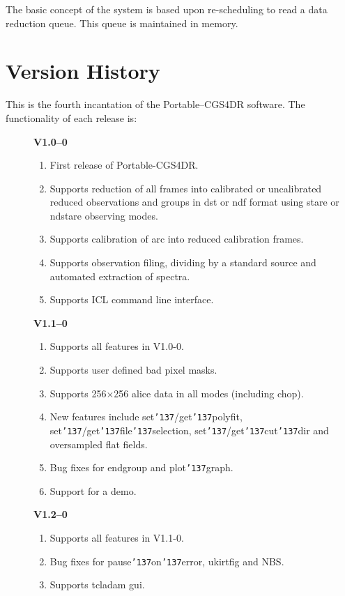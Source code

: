 \documentclass[a4paper]{book}
\renewcommand{\_}{{\tt\char'137}}
\begin{document}
The basic concept of the system is based upon re-scheduling to read a 
data reduction queue.  This queue is maintained in memory.

\section{Version History}
This is the fourth incantation of the Portable--CGS4DR software. The
functionality of each release is:

\begin{description}
\item[] {\bf V1.0--0}
 \begin{enumerate}
  \item First release of Portable-CGS4DR.
  \item Supports reduction of all frames into calibrated or uncalibrated reduced 
        observations and groups in {\sc dst} or {\sc ndf} format using {\sc stare} 
        or {\sc ndstare} observing modes.
  \item Supports calibration of {\sc arc} into reduced calibration frames.
  \item Supports observation filing, dividing by a standard source and automated
        extraction of spectra.
  \item Supports ICL command line interface.
 \end{enumerate}
\item[] {\bf V1.1--0}
 \begin{enumerate}
  \item Supports all features in V1.0-0.
  \item Supports user defined bad pixel masks.
  \item Supports 256$\times$256 {\sc alice} data in all modes (including {\sc chop}).
  \item New features include set\_/get\_polyfit, set\_/get\_file\_selection, set\_/get\_cut\_dir
        and oversampled {\sc flat} fields.
  \item Bug fixes for endgroup and plot\_graph.
  \item Support for a demo.
 \end{enumerate}
\item[] {\bf V1.2--0}
 \begin{enumerate}
  \item Supports all features in V1.1-0.
  \item Bug fixes for pause\_on\_error, ukirtfig and NBS.
  \item Supports {\sc tcladam} {\sc gui}.

\end{enumerate}
\end{description}
\end{document}
